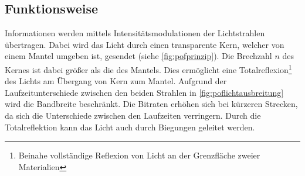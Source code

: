 \subsection{Funktionsweise}
\label{subsec:poffunktionsweise}

Informationen werden mittels Intensitätsmodulationen der Lichtstrahlen
übertragen. Dabei wird das Licht durch einen transparente Kern, welcher von
einem Mantel umgeben ist, gesendet (siehe \autoref{fig:pofprinzip}). Die
Brechzahl $n$ des Kernes ist dabei größer als die des Mantels. Dies ermöglicht
eine Totalreflexion\footnote{Beinahe vollständige Reflexion von Licht an der
Grenzfläche zweier Materialien} des Lichts am Übergang von Kern zum Mantel.
Aufgrund der Laufzeitunterschiede zwischen den beiden Strahlen in
\autoref{fig:poflichtausbreitung} wird die Bandbreite beschränkt. Die Bitraten
erhöhen sich bei kürzeren Strecken, da sich die Unterschiede zwischen den
Laufzeiten verringern. Durch die Totalreflektion kann das Licht auch durch
Biegungen geleitet werden.

